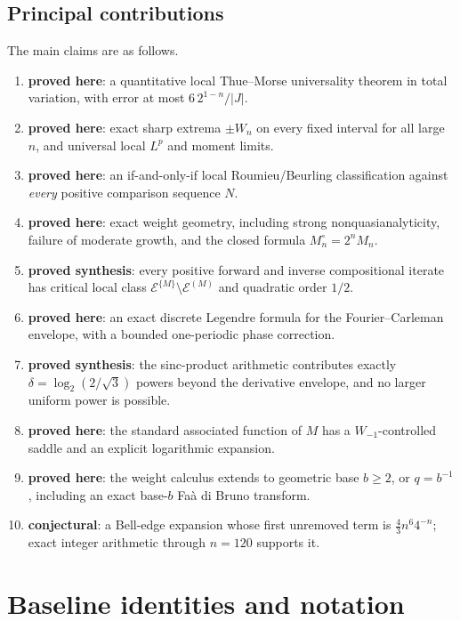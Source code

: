 \documentclass[11pt,a4paper]{article}
\theoremstyle{definition}
\theoremstyle{remark}
\newcommand{\statusproved}{\textcolor{deepgreen}{\textbf{proved here}}}
\newcommand{\statussynth}{\textcolor{deepblue}{\textbf{proved synthesis}}}
\newcommand{\statusconj}{\textcolor{deepred}{\textbf{conjectural}}}
\begin{document}
\subsection{Principal contributions}

The main claims are as follows.

\begin{enumerate}[label=\textbf{R\arabic*.},leftmargin=2.5em]
\item \statusproved: a quantitative local Thue--Morse universality theorem in total
variation, with error at most $6\,2^{1-n}/|J|$.
\item \statusproved: exact sharp extrema $\pm W_n$ on every fixed interval for all
large $n$, and universal local $L^p$ and moment limits.
\item \statusproved: an if-and-only-if local Roumieu/Beurling classification against
\emph{every} positive comparison sequence $N$.
\item \statusproved: exact weight geometry, including strong nonquasianalyticity,
failure of moderate growth, and the closed formula $M_n^\circ=2^nM_n$.
\item \statussynth: every positive forward and inverse compositional iterate has
critical local class $\mathcal E^{\{M\}}\setminus\mathcal E^{(M)}$ and quadratic
order $1/2$.
\item \statusproved: an exact discrete Legendre formula for the Fourier--Carleman
envelope, with a bounded one-periodic phase correction.
\item \statussynth: the sinc-product arithmetic contributes exactly
$\delta=\log_2(2/\sqrt3)$ powers beyond the derivative envelope, and no larger
uniform power is possible.
\item \statusproved: the standard associated function of $M$ has a
$W_{-1}$-controlled saddle and an explicit logarithmic expansion.
\item \statusproved: the weight calculus extends to geometric base $b\ge2$, or
$q=b^{-1}$, including an exact base-$b$ Fa\`a di Bruno transform.
\item \statusconj: a Bell-edge expansion whose first unremoved term is
$\frac43 n^6 4^{-n}$; exact integer arithmetic through $n=120$ supports it.
\end{enumerate}

\section{Baseline identities and notation}
\label{sec:baseline}
\end{document}
